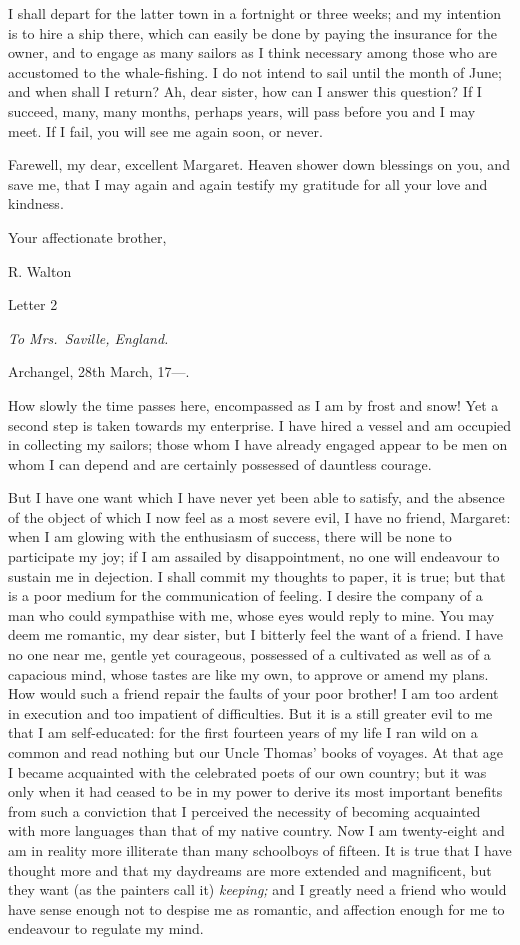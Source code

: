 \documentclass[12pt,openright]{book}
\begin{document}
I shall depart for the latter town in a fortnight or three weeks; and my intention is to hire a ship there, which can easily be done by paying the insurance for the owner, and to engage as many sailors as I think necessary among those who are accustomed to the whale-fishing. I do not intend to sail until the month of June; and when shall I return? Ah, dear sister, how can I answer this question? If I succeed, many, many months, perhaps years, will pass before you and I may meet. If I fail, you will see me again soon, or never.

Farewell, my dear, excellent Margaret. Heaven shower down blessings on you, and save me, that I may again and again testify my gratitude for all your love and kindness.

Your affectionate brother,

R. Walton

Letter 2

\textit{To Mrs. Saville, England.}

Archangel, 28th March, 17—.

How slowly the time passes here, encompassed as I am by frost and snow! Yet a second step is taken towards my enterprise. I have hired a vessel and am occupied in collecting my sailors; those whom I have already engaged appear to be men on whom I can depend and are certainly possessed of dauntless courage.

But I have one want which I have never yet been able to satisfy, and the absence of the object of which I now feel as a most severe evil, I have no friend, Margaret: when I am glowing with the enthusiasm of success, there will be none to participate my joy; if I am assailed by disappointment, no one will endeavour to sustain me in dejection. I shall commit my thoughts to paper, it is true; but that is a poor medium for the communication of feeling. I desire the company of a man who could sympathise with me, whose eyes would reply to mine. You may deem me romantic, my dear sister, but I bitterly feel the want of a friend. I have no one near me, gentle yet courageous, possessed of a cultivated as well as of a capacious mind, whose tastes are like my own, to approve or amend my plans. How would such a friend repair the faults of your poor brother! I am too ardent in execution and too impatient of difficulties. But it is a still greater evil to me that I am self-educated: for the first fourteen years of my life I ran wild on a common and read nothing but our Uncle Thomas’ books of voyages. At that age I became acquainted with the celebrated poets of our own country; but it was only when it had ceased to be in my power to derive its most important benefits from such a conviction that I perceived the necessity of becoming acquainted with more languages than that of my native country. Now I am twenty-eight and am in reality more illiterate than many schoolboys of fifteen. It is true that I have thought more and that my daydreams are more extended and magnificent, but they want (as the painters call it) \textit{keeping;} and I greatly need a friend who would have sense enough not to despise me as romantic, and affection enough for me to endeavour to regulate my mind.
\end{document}
